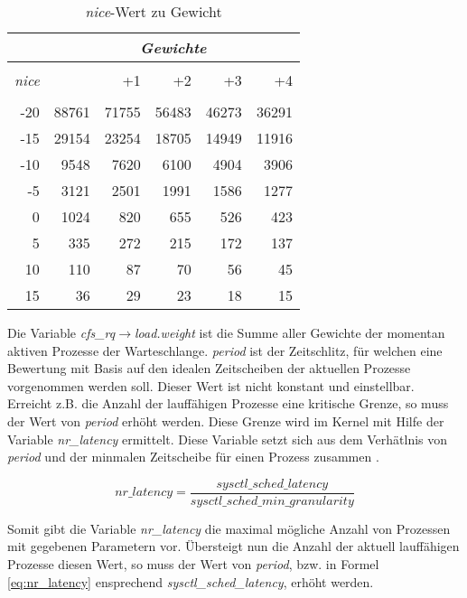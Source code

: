 \begin {table}[h]
\begin{center}
\begin{tabular}{r|rrrrr}
 &	\multicolumn{5}{c}{\textit{Gewichte}} \\
	\hline\hline
	\\[\dimexpr-\normalbaselineskip+2pt]
	\textit{nice} & &+1	&	+2	& +3	& +4	\\
	\hline
    \\[\dimexpr-\normalbaselineskip+2pt]
	-20	&	88761	&	71755	&	56483	&	46273	&	36291	\\
	-15	&	29154 	&	23254 	&	18705 	&	14949 	&	11916	\\
	-10	&	9548	&	7620	&	6100	&	4904	&	3906	\\
	-5 	&	3121 	&	2501 	&	1991 	&	1586 	&	1277	\\
	0	&	1024 	&	820		&	655		&	526		&	423		\\
	5 	&	335 	&	272		& 	215		&	172		&	137		\\
	10	&	110		&	87 		&	70 		&	56 		&	45		\\
	15 	&	36 		&	29 		&	23 		&	18 		&	15	 	\\		
\end{tabular}
\caption {\textit{nice}-Wert zu Gewicht} \label{tab:nice2weight} 
\end{center}
\end{table}

   
Die Variable \textit{cfs\_rq$\rightarrow$load.weight} ist die Summe aller Gewichte der momentan aktiven Prozesse der Warte\-schlan\-ge.
\textit{period} ist der Zeitschlitz, für welchen eine Bewertung mit Basis auf den idealen Zeitscheiben der aktuellen Prozesse vorgenommen werden soll. Dieser Wert ist nicht konstant und einstellbar. Erreicht z.B. die Anzahl der lauf\-fähigen Prozesse eine kritische Grenze, so muss der Wert von \textit{period} erhöht werden. 
Diese Grenze wird im Kernel mit Hilfe der Variable \textit{nr\_latency} ermittelt. Diese Variable setzt sich aus dem Verhätlnis von \textit{period} und der minmalen Zeitscheibe für einen Prozess zusammen \cite{paperfairness}.

\begin{equation}
nr\_latency = \frac{sysctl\_sched\_latency}{sysctl\_sched\_min\_granularity}
\label{eq:nr_latency}
\end{equation}

Somit gibt die Variable \textit{nr\_latency} die maximal mögliche Anzahl von Prozessen mit gegebenen Parametern vor. Über\-steigt nun die Anzahl der aktuell lauffähigen Prozesse diesen Wert, so muss der Wert von \textit{period}, bzw. in Formel \ref{eq:nr_latency} ensprechend \textit{sysctl\_sched\_latency}, erhöht werden.

